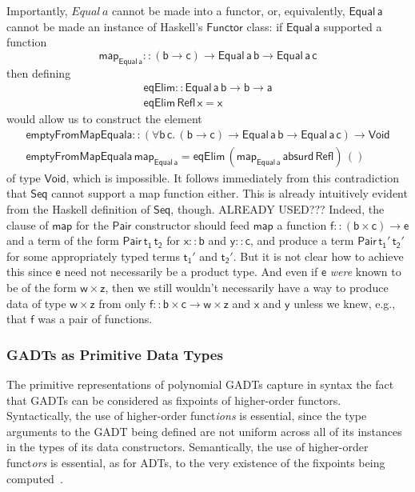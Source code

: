 \documentclass[acmsmall,screen,review,anonymous]{acmart}
\theoremstyle{definition}
\begin{document}
Importantly, $\mathit{Equal}\,a$ cannot be made into a functor, or,
equivalently, $\mathsf{Equal\,a}$ cannot be made an instance of
Haskell's $\mathsf{Functor}$ class: if $\mathsf{Equal\,a}$ supported a
function
\[\mathsf{map_{Equal\,a} :: (b \to c) \to Equal\,a\,b \to
  Equal\,a\,c}\]
then defining
\[\begin{array}{l}
\mathsf{eqElim :: Equal\, a\, b \to b \to a}\\
\mathsf{eqElim\, Refl\, x = x} 
\end{array}\]
would allow us to construct the element 
\[\begin{array}{l}
\mathsf{emptyFromMapEquala :: (\forall b\, c.\, (b \to c) \to Equal\, a\,
  b \to Equal\, a \,c) \to Void}\\ 
\mathsf{emptyFromMapEquala \,map_{Equal\,a} = eqElim\, (map_{Equal\,a}\,
  absurd\, Refl)\, ()}  
\end{array}\]
of type $\mathsf{Void}$, which is impossible. It follows immediately
from this contradiction that $\mathsf{Seq}$ cannot support a map
function either. This is already intuitively evident from the Haskell
definition of $\mathsf{Seq}$, though. ALREADY USED??? Indeed, the clause of
$\mathsf{map}$ for the $\mathsf{Pair}$ constructor should feed
$\mathsf{map}$ a function $\mathsf{f :: (b \times c) \to e}$ and a
term of the form $\mathsf{Pair \,t_1\,t_2}$ for $\mathsf{x :: b}$ and
$\mathsf{y :: c}$, and produce a term $\mathsf{Pair\,t_1'\,t_2'}$ for
some appropriately typed terms $\mathsf{t_1'}$ and
$\mathsf{t_2'}$. But it is not clear how to achieve this since
$\mathsf{e}$ need not necessarily be a product type. And even if
$\mathsf{e}$ {\em were} known to be of the form $\mathsf{w \times z}$,
then we still wouldn't necessarily have a way to produce data of type
$\mathsf{w \times z}$ from only $\mathsf{f :: b \times c \to w \times
  z}$ and $\mathsf{x}$ and $\mathsf{y}$ unless we knew, e.g., that
$\mathsf{f}$ was a pair of functions.

\subsubsection{GADTs as Primitive Data Types}\label{sec:prim-gadts}

The primitive representations of {\color{blue} polynomial} GADTs
capture in syntax the fact that GADTs can be considered as fixpoints
of higher-order functors. Syntactically, the use of higher-order
funct{\em ions} is essential, since the type arguments to the GADT
being defined are not uniform across all of its instances in the types
of its data constructors. Semantically, the use of higher-order
funct{\em ors} is essential, as for ADTs, to the very existence of the
fixpoints being computed~\cite{tfca}.
\end{document}

